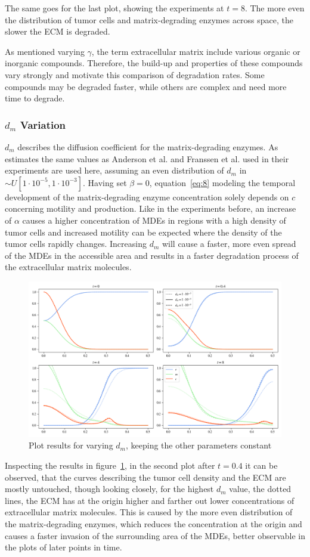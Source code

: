 The same goes for the last plot, showing the experiments at $t=8$. The more even the distribution of tumor cells and matrix-degrading enzymes across space, the slower the ECM is degraded.

As mentioned varying $\gamma$, the term extracellular matrix include various organic or inorganic compounds. Therefore, the build-up and properties of these compounds vary strongly and motivate this comparison of degradation rates. Some compounds may be degraded faster, while others are complex and need more time to degrade. 

\subsubsection*{$d_m$ Variation}
$d_m$ describes the diffusion coefficient for the matrix-degrading enzymes. As estimates the same values as Anderson et al. and Franssen et al. used in their experiments are used here, assuming an even distribution of $d_m$ in $\sim U[1\cdot 10^{-5},1\cdot 10^{-3}]$. Having set $\beta=0$, equation~\ref{eq:8} modeling the temporal development of the matrix-degrading enzyme concentration solely depends on $c$ concerning motility and production. Like in the experiments before, an increase of $\alpha$ causes a higher concentration of MDEs in regions with a high density of tumor cells and increased motility can be expected where the density of the tumor cells rapidly changes. Increasing $d_m$ will cause a faster, more even spread of the MDEs in the accessible area and results in a faster degradation process of the extracellular matrix molecules.
\begin{figure}[h]
 \centering
 \includegraphics[width=\textwidth]{resources/images/dm_variation.png}
 \caption{Plot results for varying $d_m$, keeping the other parameters constant}
 \label{fig:dm_variation}
\end{figure}
Inspecting the results in figure~\ref{fig:dm_variation}, in the second plot after $t=0.4$ it can be observed, that the curves describing the tumor cell density and the ECM are mostly untouched, though looking closely, for the highest $d_m$ value, the dotted lines, the ECM has at the origin higher and farther out lower concentrations of extracellular matrix molecules. This is caused by the more even distribution of the matrix-degrading enzymes, which reduces the concentration at the origin and causes a faster invasion of the surrounding area of the MDEs, better observable in the plots of later points in time.

